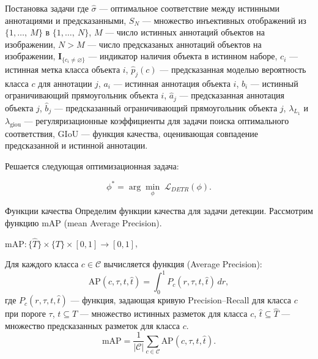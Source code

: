 \documentclass{beamer}
\begin{document}
\begin{frame}{Постановка задачи}
\small{
где $\hat\sigma$ — оптимальное соответствие между истинными аннотациями и предсказанными,
$S_N$ — множество инъективных отображений из ${\{1,\dots,\ M\}}$ в ${\{1,\dots, \ N\}}$,
$M$ — число истинных аннотаций объектов на изображении,
$N > M$ — число предсказаных аннотаций объектов на изображении,
$\mathbf{I}_{\{c_i\neq\varnothing\}}$ — индикатор наличия объекта в истинном наборе,
$c_i$ — истинная метка класса объекта $i$,
$\hat p_j(c)$ — предсказанная моделью вероятность класса $c$ для аннотации $j$,
$a_i$ — истинная аннотация объекта $i$, $b_i$ — истинный ограничивающий прямоугольник объекта $i$, 
$\hat a_j$ — предсказанная аннотация объекта $j$, $\hat b_j$ — предсказанный ограничивающий прямоугольник объекта $j$, $\lambda_{L_1}$ и $\lambda_{\text{giou}}$ — регуляризационные коэффициенты для задачи поиска оптимального соответствия, GIoU — функция качества, оценивающая совпадение предсказанной и истинной аннотации.}

\begin{center}
Решается следующая оптимизационная задача:
\end{center}
\[
\phi^* = \arg\min_{\phi}\;\mathcal{L}_{DETR}(\phi).
\]



\end{frame}


\begin{frame}{Функции качества}
Определим функции качества для задачи детекции.
Рассмотрим функцию $\text{mAP}$ (mean Average Precision).
\begin{center}
   $\text{mAP}: \{ \hat{T} \}  \times \{ T \} \times [0,1] \to [0,1]$,
\end{center}



Для каждого класса \(c \in \mathcal{C}\) вычисляется функция  (Average Precision):
\[
\text{AP}(c, \tau, t, \hat{t}) = \int_{0}^{1} P_c(r, \tau, t, \hat{t}) \, dr,
\]
где \(P_c(r, \tau, t, \hat{t})\) --- функция, задающая кривую Precision–Recall для класса \(c\) при пороге $\tau$, $t \subseteq T$ — множество истинных разметок для класса \(c\), $\hat{t} \subseteq \hat{T}$ — множество предсказанных разметок для класса \(c\).
\[
\text{mAP} = \frac{1}{|\mathcal{C}|} \sum_{c \in \mathcal{C}} \text{AP}(c, \tau, t, \hat{t}).
\]

\end{frame}
\end{document}
